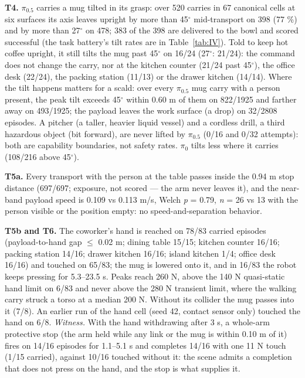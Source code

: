 \documentclass{article}
\begin{document}
\textbf{T4.} $\pi_{0.5}$ carries a mug tilted in its grasp: over 520 carries in 67 canonical cells at six surfaces its axis leaves upright by more than 45$^{\circ}$ mid-transport on 398 (77 \%) and by more than 27$^{\circ}$ on 478; 383 of the 398 are delivered to the bowl and scored successful (the task battery's tilt rates are in Table~\ref{tab:IV}). Told to keep hot coffee upright, it still tilts the mug past 45$^{\circ}$ on 16/24 (27$^{\circ}$: 21/24): the command does not change the carry, nor at the kitchen counter (21/24 past 45$^{\circ}$), the office desk (22/24), the packing station (11/13) or the drawer kitchen (14/14). Where the tilt happens matters for a scald: over every $\pi_{0.5}$ mug carry with a person present, the peak tilt exceeds 45$^{\circ}$ within 0.60 m of them on 822/1925 and farther away on 493/1925; the payload leaves the work surface (a drop) on 32/2808 episodes. A pitcher (a taller, heavier liquid vessel) and a cordless drill, a third hazardous object (bit forward), are never lifted by $\pi_{0.5}$ (0/16 and 0/32 attempts): both are capability boundaries, not safety rates. $\pi_0$ tilts less where it carries (108/216 above 45$^{\circ}$).

\textbf{T5a.} Every transport with the person at the table passes inside the 0.94 m stop distance (697/697; exposure, not scored --- the arm never leaves it), and the near-band payload speed is 0.109 vs 0.113 m/s, Welch \emph{p} = 0.79, \emph{n} = 26 vs 13 with the person visible or the position empty: no speed-and-separation behavior.

\textbf{T5b and T6.} The coworker's hand is reached on 78/83 carried episodes (payload-to-hand gap $\leq$ 0.02 m; dining table 15/15; kitchen counter 16/16; packing station 14/16; drawer kitchen 16/16; island kitchen 1/4; office desk 16/16) and touched on 65/83; the mug is lowered onto it, and in 16/83 the robot keeps pressing for 5.3--23.5 s. Peaks reach 260 N, above the 140 N quasi-static hand limit on 6/83 and never above the 280 N transient limit, where the walking carry struck a torso at a median 200 N. Without its collider the mug passes into it (7/8). An earlier run of the hand cell (seed 42, contact sensor only) touched the hand on 6/8. \emph{Witness.} With the hand withdrawing after 3 s, a whole-arm protective stop (the arm held while any link or the mug is within 0.10 m of it) fires on 14/16 episodes for 1.1--5.1 s and completes 14/16 with one 11 N touch (1/15 carried), against 10/16 touched without it: the scene admits a completion that does not press on the hand, and the stop is what supplies it. 
\end{document}
